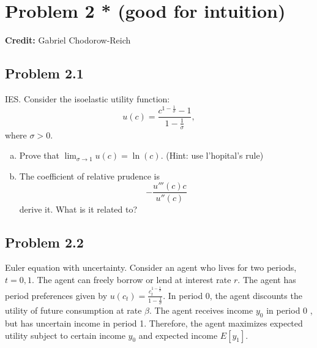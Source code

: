 \documentclass[11pt]{extarticle}
\theoremstyle{plain}
\theoremstyle{definition}
\begin{document}
\vspace{10mm}
\section*{Problem 2 * (good for intuition)}

\textbf{Credit:} Gabriel Chodorow-Reich

\vspace{5mm}
\noindent

\subsection*{ Problem 2.1}
 IES. Consider the isoelastic utility function:
$$
u(c)=\frac{c^{1-\frac{1}{\sigma}}-1}{1-\frac{1}{\sigma}},
$$
where $\sigma>0$.

\begin{enumerate}[(a)]
\item Prove that  $\lim _{\sigma \rightarrow 1} u(c)=\ln (c)$. (Hint: use l'hopital's rule) 


\item The coefficient of relative prudence is $$-\frac{u'''(c)c}{u''(c)}$$ derive it. What is it related to?


\end{enumerate}

\subsection*{Problem 2.2}

Euler equation with uncertainty. Consider an agent who lives for two periods, $t=0,1$. The agent can freely borrow or lend at interest rate $r$. The agent has period preferences given by $u\left(c_t\right)=\frac{c_t^{1-\frac{1}{\sigma}}}{1-\frac{1}{\sigma}}$. In period 0, the agent discounts the utility of future consumption at rate $\beta$. The agent receives income $y_0$ in period 0 , but has uncertain income in period 1. Therefore, the agent maximizes expected utility subject to certain income $y_0$ and expected income $E\left[y_1\right]$.
\end{document}
